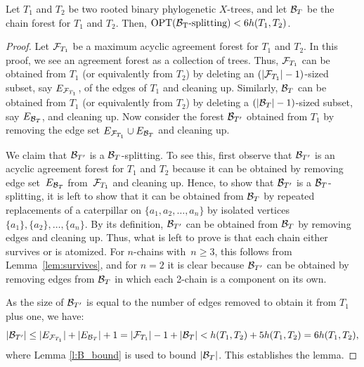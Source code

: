\begin{lemma}\label{l:bSplitting}
Let $T_1$ and $T_2$ be two rooted binary phylogenetic $X$-trees, and let ${\mathcal B}_T$ be the chain forest for $T_1$ and $T_2$. Then, ${\rm OPT({\mathcal B}_T\mbox{-\rm splitting})}<6h(T_1,T_2)$.
\end{lemma}
\begin{proof}
Let ${\mathcal F}_{T_1}$ be a maximum acyclic agreement forest for $T_1$ and $T_2$. In this proof, we see an agreement forest as a collection of trees. Thus, ${\mathcal F}_{T_1}$ can be obtained from $T_1$ (or equivalently from $T_2$) by deleting an $(|{\mathcal F}_{T_1}|-1)$-sized subset, say $E_{{\mathcal F}_{T_1}}$, of the edges of $T_1$ and cleaning up. Similarly, ${\mathcal B}_T$ can be obtained from $T_1$ (or equivalently from $T_2$) by deleting a $(|{\mathcal B}_T|-1)$-sized subset, say $E_{{\mathcal B}_T}$, and cleaning up. Now consider the forest ${\mathcal B}_{T'}$ obtained from $T_1$ by removing the edge set $E_{{\mathcal F}_{T_1}} \cup E_{{\mathcal B}_T}$ and cleaning up.

We claim that ${\mathcal B}_{T'}$ is a ${\mathcal B}_T$-splitting. To see this, first observe that ${\mathcal B}_{T'}$ is an acyclic agreement forest for $T_1$ and $T_2$ because it can be obtained by removing edge set~$E_{{\mathcal B}_T}$ from~${\mathcal F}_{T_1}$ and cleaning up. Hence, to show that ${\mathcal B}_{T'}$ is a ${\mathcal B}_T$-splitting, it is left to show that it can be obtained from ${\mathcal B}_T$ by repeated replacements of a caterpillar on $\{a_1,a_2,\ldots,a_n\}$ by isolated vertices $\{a_1\},\{a_2\},\ldots,\{a_n\}$. By its definition, ${\mathcal B}_{T'}$ can be obtained from ${\mathcal B}_T$ by removing edges and cleaning up. Thus, what is left to prove is that each chain either survives or is atomized. For $n$-chains with~$n\geq 3$, this follows from Lemma~\ref{lem:survives}, and for $n=2$ it is clear because ${\mathcal B}_{T'}$ can be obtained by removing edges from ${\mathcal B}_T$ in which each 2-chain is a component on its own.

As the size of ${\mathcal B}_{T'}$ is equal to the number of edges removed to obtain it from $T_1$ plus one, we have:
\[|{\mathcal B}_{T'}| \leq |E_{{\mathcal F}_{T_1}}| + |E_{{\mathcal B}_T}| +1 = |{\mathcal F}_{T_1}| - 1 + |{\mathcal B}_T| < h(T_1,T_2) + 5 h(T_1,T_2) = 6 h(T_1,T_2),\]
{where Lemma \ref{l:B_bound} is used to bound $|{\mathcal B}_T|$.} This establishes the lemma.
\end{proof}

